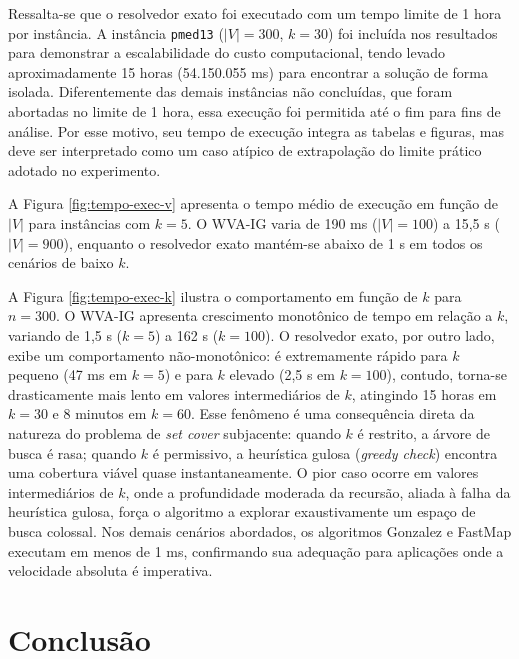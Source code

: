 \documentclass[12pt]{article}
\begin{document}
Ressalta-se que o resolvedor exato foi executado com um tempo limite de 1 hora por instância. A instância \texttt{pmed13} ($|V|=300$, $k=30$) foi incluída nos resultados para demonstrar a escalabilidade do custo computacional, tendo levado aproximadamente 15 horas (54.150.055 ms) para encontrar a solução de forma isolada. Diferentemente das demais instâncias não concluídas, que foram abortadas no limite de 1 hora, essa execução foi permitida até o fim para fins de análise. Por esse motivo, seu tempo de execução integra as tabelas e figuras, mas deve ser interpretado como um caso atípico de extrapolação do limite prático adotado no experimento.

A Figura \ref{fig:tempo-exec-v} apresenta o tempo médio de execução em função de $|V|$ para instâncias com $k=5$. O WVA-IG varia de 190 ms ($|V|=100$) a 15,5 s ($|V|=900$), enquanto o resolvedor exato mantém-se abaixo de 1 s em todos os cenários de baixo $k$.

A Figura \ref{fig:tempo-exec-k} ilustra o comportamento em função de $k$ para $n=300$. O WVA-IG apresenta crescimento monotônico de tempo em relação a $k$, variando de 1,5 s ($k=5$) a 162 s ($k=100$). O resolvedor exato, por outro lado, exibe um comportamento não-monotônico: é extremamente rápido para $k$ pequeno (47 ms em $k=5$) e para $k$ elevado (2,5 s em $k=100$), contudo, torna-se drasticamente mais lento em valores intermediários de $k$, atingindo 15 horas em $k=30$ e 8 minutos em $k=60$. Esse fenômeno é uma consequência direta da natureza do problema de \textit{set cover} subjacente: quando $k$ é restrito, a árvore de busca é rasa; quando $k$ é permissivo, a heurística gulosa (\textit{greedy check}) encontra uma cobertura viável quase instantaneamente. O pior caso ocorre em valores intermediários de $k$, onde a profundidade moderada da recursão, aliada à falha da heurística gulosa, força o algoritmo a explorar exaustivamente um espaço de busca colossal. Nos demais cenários abordados, os algoritmos Gonzalez e FastMap executam em menos de 1 ms, confirmando sua adequação para aplicações onde a velocidade absoluta é imperativa.

\section{Conclusão}
\end{document}
